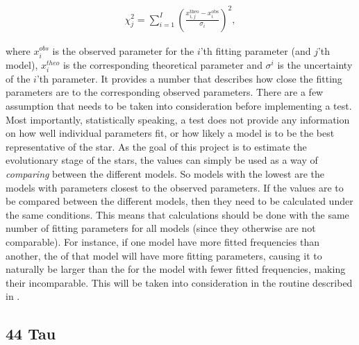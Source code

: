 \begin{align}
\label{standard_chi}
\chi^2_j = \sum^I_{i=1}\left(\frac{x^{\text{theo}}_{i,j}-x^{\text{obs}}_i}{\sigma_i}\right)^2,
\end{align}

\noindent where $x_i^{obs}$ is the observed parameter for the $i$'th fitting parameter (and $j$'th model), $x^{theo}_i$ is the corresponding theoretical parameter and $\sigma^i$ is the uncertainty of the $i$'th parameter. It provides a number that describes how close the fitting parameters are to the corresponding observed parameters. There are a few assumption that needs to be taken into consideration before implementing a \chis test. Most importantly, statistically speaking, a \chis test does not provide any information on how well individual parameters fit, or how likely a model is to be the best representative of the star. As the goal of this project is to estimate the evolutionary stage of the stars, the \chis values can simply be used as a way of \textit{comparing} between the different models. So models with the lowest \chis are the models with parameters closest to the observed parameters. 
If the \chis values are to be compared between the different models, then they need to be calculated under the same conditions. This means that calculations should be done with the same number of fitting parameters for all models (since they otherwise are not comparable). For instance, if one model have more fitted frequencies than another, the \chis of that model will have more fitting parameters, causing it to naturally be larger than the \chis for the model with fewer fitted frequencies, making their \chis incomparable. This will be taken into consideration in the routine described in .


\subsection{44 Tau}
\label{sec:chi44}


